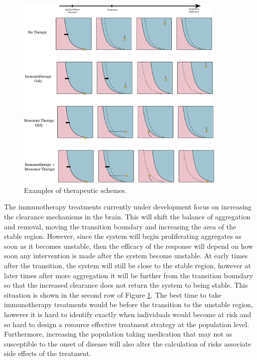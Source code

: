 \begin{figure}
    \centering
    \includegraphics[width=0.9\textwidth]{figures/4-agg-figs/therapyScheme.pdf}
    \caption{Examples of therapeutic schemes.}
    \label{fig:4-therapyscheme}
\end{figure}

The immunotherapy treatments currently under development focus on increasing the clearance mechanisms in the brain. This will shift the balance of aggregation and removal, moving the transition boundary and increasing the area of the stable region. However, since the system will begin proliferating aggregates as soon as it becomes unstable, then the efficacy of the response will depend on how soon any intervention is made after the system become unstable. At early times after the transition, the system will still be close to the stable region, however at later times after more aggregation it will be further from the transition boundary so that the increased clearance does not return the system to being stable. This situation is shown in the second row of Figure \ref{fig:4-therapyscheme}. The best time to take immunotherapy treatments would be before the transition to the unstable region, however it is hard to identify exactly when individuals would become at risk and so hard to design a resource effective treatment strategy at the population level. Furthermore, increasing the population taking medication that may not as susceptible to the onset of disease will also alter the calculation of risks associate side effects of the treatment.

